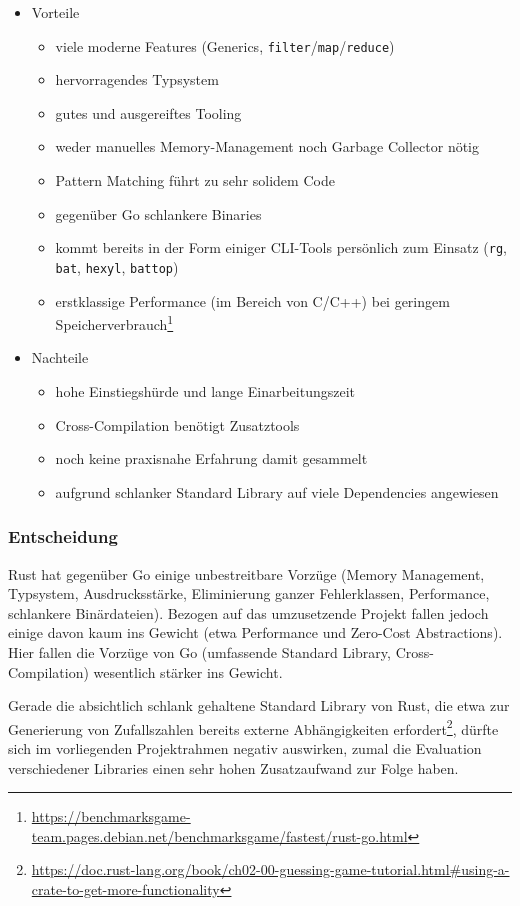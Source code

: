 \begin{itemize}
	\item Vorteile
		\begin{itemize}
			\item viele moderne Features (Generics, \texttt{filter}/\texttt{map}/\texttt{reduce})
			\item hervorragendes Typsystem
			\item gutes und ausgereiftes Tooling
			\item weder manuelles Memory-Management noch Garbage Collector nötig
			\item Pattern Matching führt zu sehr solidem Code
			\item gegenüber Go schlankere Binaries
			\item kommt bereits in der Form einiger CLI-Tools persönlich zum Einsatz (\texttt{rg}, \texttt{bat}, \texttt{hexyl}, \texttt{battop})
			\item erstklassige Performance (im Bereich von C/C++) bei geringem Speicherverbrauch\footnote{\url{https://benchmarksgame-team.pages.debian.net/benchmarksgame/fastest/rust-go.html}}
		\end{itemize}
	\item Nachteile
		\begin{itemize}
			\item hohe Einstiegshürde und lange Einarbeitungszeit
			\item Cross-Compilation benötigt Zusatztools
			\item noch keine praxisnahe Erfahrung damit gesammelt
			\item aufgrund schlanker Standard Library auf viele Dependencies angewiesen
		\end{itemize}
\end{itemize}

\subsubsection{Entscheidung}

Rust hat gegenüber Go einige unbestreitbare Vorzüge (Memory Management, Typsystem, Ausdrucksstärke, Eliminierung ganzer Fehlerklassen, Performance, schlankere Binärdateien). Bezogen auf das umzusetzende Projekt fallen jedoch einige davon kaum ins Gewicht (etwa Performance und Zero-Cost Abstractions). Hier fallen die Vorzüge von Go (umfassende Standard Library, Cross-Compilation) wesentlich stärker ins Gewicht.

Gerade die absichtlich schlank gehaltene Standard Library von Rust, die etwa zur Generierung von Zufallszahlen bereits externe Abhängigkeiten erfordert\footnote{\url{https://doc.rust-lang.org/book/ch02-00-guessing-game-tutorial.html\#using-a-crate-to-get-more-functionality}}, dürfte sich im vorliegenden Projektrahmen negativ auswirken, zumal die Evaluation verschiedener Libraries einen sehr hohen Zusatzaufwand zur Folge haben.

